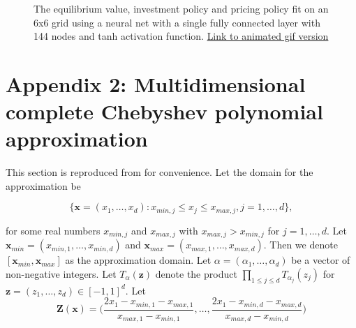 \documentclass[12pt]{article}
\begin{document}
\begin{figure}[H]
  \centering
  \caption{The equilibrium value, investment policy and pricing policy fit on an 6x6 grid using a neural net with a single fully connected layer with 144 nodes and tanh activation function. \href{https://github.com/wmjones/VFA-for-dynamic-games/blob/master/gif_ann_6.gif}{Link to animated gif version}}
\end{figure}

\section*{Appendix 2: Multidimensional complete Chebyshev polynomial approximation}
\label{multicheb}

This section is reproduced from \citet{2015_Judd_Cai} for convenience. Let the domain for the approximation be

\begin{equation*}
  \{\boldsymbol{x}=(x_1,\dots,x_d):x_{min,j}\leq x_j \leq x_{max,j}, j=1,\dots,d \},
\end{equation*}

for some real numbers $x_{min,j}$ and $x_{max,j}$ with $x_{max,j} > x_{min,j}$ for $j=1,\dots,d$. Let $\boldsymbol{x}_{min}=(x_{min,1},\dots,x_{min,d})$ and $\boldsymbol{x}_{max}=(x_{max,1},\dots,x_{max,d})$. Then we denote $[\boldsymbol{x}_{min},\boldsymbol{x}_{max}]$ as the approximation domain. Let $\alpha=(\alpha_1,\dots,\alpha_d)$ be a vector of non-negative integers. Let $T_\alpha(\boldsymbol{z})$ denote the product $\prod_{1\leq j \leq d} T_{\alpha_j}(z_j)$ for $\boldsymbol{z}=(z_1,\dots,z_d) \in [-1,1]^d$. Let
\begin{equation*}
  \boldsymbol{Z}(\boldsymbol{x})=\bigg( \frac{2x_1-x_{min,1}-x_{max,1}}{x_{max,1}-x_{min,1}},\dots,\frac{2x_1-x_{min,d}-x_{max,d}}{x_{max,d}-x_{min,d}} \bigg)
\end{equation*}
\end{document}
